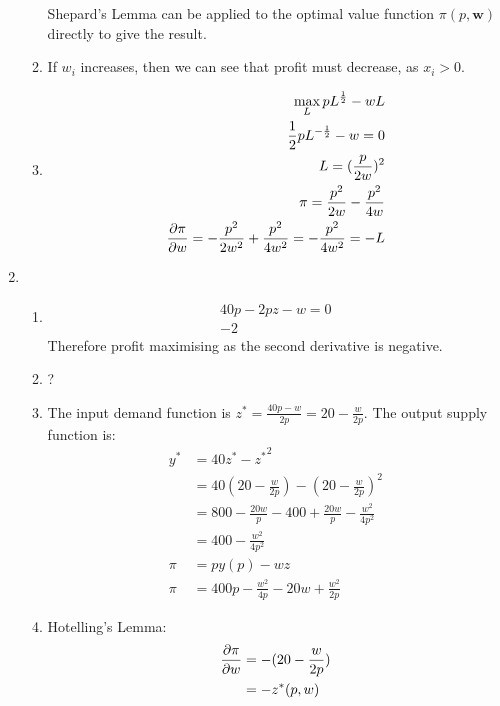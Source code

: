 \documentclass{article}
\begin{document}
\begin{enumerate}
\begin{enumerate}
            Shepard's Lemma can be applied to the optimal value function $\pi(p, \textbf{w})$ directly to give the result.

            \item If $w_i$ increases, then we can see that profit must decrease, as $x_i > 0$.
            \item \begin{align}
                \max_{L} pL^\frac{1}{2} - wL \\
                \frac{1}{2}pL^{-\frac{1}{2}} - w = 0 \\
                L = (\frac{p}{2w})^2 \\
                \pi = \frac{p^2}{2w} - \frac{p^2}{4w} \\
                \pdv{\pi}{w} = -\frac{p^2}{2w^2} + \frac{p^2}{4w^2} = -\frac{p^2}{4w^2} = -L
            \end{align}
        \end{enumerate}

        \item \begin{enumerate}
            \item \begin{align}
                40p - 2pz - w = 0 \\
                -2
            \end{align}
            Therefore profit maximising as the second derivative is negative. 
            \item ?
            \item The input demand function is $z^* = \frac{40p - w}{2p} = 20 - \frac{w}{2p}$. The output supply function is:
            \begin{align}
                y^* &= 40z^* - {z^*}^2 \\
                &= 40(20 - \frac{w}{2p}) - (20 - \frac{w}{2p})^2 \\
                &= 800 - \frac{20w}{p} - 400 + \frac{20w}{p} - \frac{w^2}{4p^2}\\
                &= 400 - \frac{w^2}{4p^2}\\
                \pi &= py(p) - wz \\
                \pi &= 400p - \frac{w^2}{4p} - 20w + \frac{w^2}{2p} 
            \end{align}
            \item Hotelling's Lemma:
            \begin{align}
                \pdv{\pi}{w} &= -(20 - \frac{w}{2p})\\
                &=-z^*(p,w)
            \end{align} 
        \end{enumerate}
    \end{enumerate}
\end{document}
